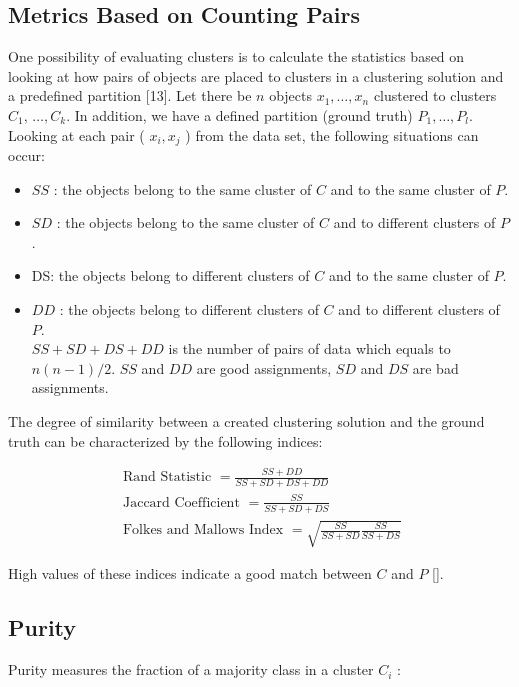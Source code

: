 \subsection{Metrics Based on Counting Pairs}
One possibility of evaluating clusters is to calculate the statistics based on looking at how pairs of objects are placed to clusters in a clustering solution and a predefined partition [13]. Let there be $n$ objects $x_{1}, \ldots, x_{n}$ clustered to clusters $C_{1}$, $\ldots, C_{k}$. In addition, we have a defined partition (ground truth) $P_{1}, \ldots, P_{l}$. Looking at each pair ( $x_{i}, x_{j}$ ) from the data set, the following situations can occur:

\begin{itemize}
  \item $S S$ : the objects belong to the same cluster of $C$ and to the same cluster of $P$.
  \item $S D$ : the objects belong to the same cluster of $C$ and to different clusters of $P$.
  \item DS: the objects belong to different clusters of $C$ and to the same cluster of $P$.
  \item $D D$ : the objects belong to different clusters of $C$ and to different clusters of $P$.\\
$S S+S D+D S+D D$ is the number of pairs of data which equals to $n(n-1) / 2$. $S S$ and $D D$ are good assignments, $S D$ and $D S$ are bad assignments.
\end{itemize}

The degree of similarity between a created clustering solution and the ground truth can be characterized by the following indices:


\begin{gather*}
\text { Rand Statistic }=\frac{S S+D D}{S S+S D+D S+D D}  \tag{12.37}\\
\text { Jaccard Coefficient }=\frac{S S}{S S+S D+D S}  \tag{12.38}\\
\text { Folkes and Mallows Index }=\sqrt{\frac{S S}{S S+S D} \frac{S S}{S S+D S}} \tag{12.39}
\end{gather*}


High values of these indices indicate a good match between $C$ and $P$ [\cite{ref110}].

\subsection{Purity}
Purity measures the fraction of a majority class in a cluster $C_{i}$ :


